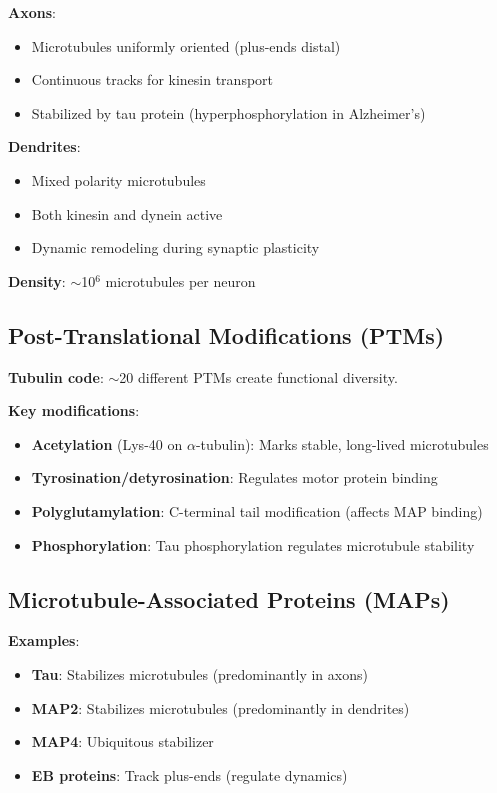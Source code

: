 \textbf{Axons}:
\begin{itemize}
\item Microtubules uniformly oriented (plus-ends distal)
\item Continuous tracks for kinesin transport
\item Stabilized by tau protein (hyperphosphorylation in Alzheimer's)
\end{itemize}

\textbf{Dendrites}:
\begin{itemize}
\item Mixed polarity microtubules
\item Both kinesin and dynein active
\item Dynamic remodeling during synaptic plasticity
\end{itemize}

\textbf{Density}: $\sim$10$^{6}$ microtubules per neuron

\subsection{Post-Translational Modifications (PTMs)}
\label{subsec:ptms}

\textbf{Tubulin code}: $\sim$20 different PTMs create functional diversity.

\textbf{Key modifications}:
\begin{itemize}
\item \textbf{Acetylation} (Lys-40 on $\alpha$-tubulin): Marks stable, long-lived microtubules
\item \textbf{Tyrosination/detyrosination}: Regulates motor protein binding
\item \textbf{Polyglutamylation}: C-terminal tail modification (affects MAP binding)
\item \textbf{Phosphorylation}: Tau phosphorylation regulates microtubule stability
\end{itemize}

\subsection{Microtubule-Associated Proteins (MAPs)}
\label{subsec:maps}

\textbf{Examples}:
\begin{itemize}
\item \textbf{Tau}: Stabilizes microtubules (predominantly in axons)
\item \textbf{MAP2}: Stabilizes microtubules (predominantly in dendrites)
\item \textbf{MAP4}: Ubiquitous stabilizer
\item \textbf{EB proteins}: Track plus-ends (regulate dynamics)
\end{itemize}


